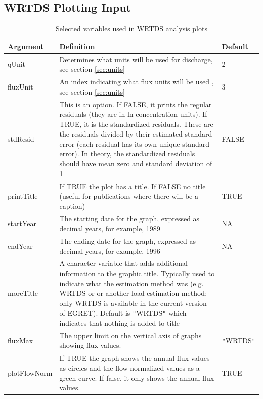 \documentclass[a4paper,11pt]{article}\usepackage[]{graphicx}\usepackage[]{color}
\begin{document}
\FloatBarrier
\clearpage

\subsection{WRTDS Plotting Input}
\label{sec:wrtdsOutputVariables}

\begin{table}[ht]
\caption{Selected variables used in WRTDS analysis plots  \label{tab:wrtdsVariables}}
\begin{tabularx}{\textwidth}{lXl}
\hline
  \textbf{Argument} & \textbf{Definition} & \textbf{Default} \\
\hline
qUnit & Determines what units will be used for discharge, see section \ref{sec:units} & 2\\
fluxUnit & An index indicating what flux units will be used , see section \ref{sec:units} & 3\\
stdResid & This is an option.  If FALSE, it prints the regular residuals (they are in ln concentration units).  If TRUE, it is the standardized residuals.  These are the residuals divided by their estimated standard error (each residual has its own unique standard error).  In theory, the standardized residuals should have mean zero and standard deviation of 1 & FALSE\\
printTitle & If TRUE the plot has a title.  If FALSE no title (useful for publications where there will be a caption) & TRUE\\
startYear & The starting date for the graph, expressed as decimal years, for example, 1989 & NA\\
endYear & The ending date for the graph, expressed as decimal years, for example, 1996 & NA\\
moreTitle & A character variable that adds additional information to the graphic title.  Typically used to indicate what the estimation method was (e.g. WRTDS or or another load estimation method; only WRTDS is available in the current version of EGRET).  Default is \texttt{"}WRTDS\texttt{"} which indicates that nothing is added to title \\
fluxMax & The upper limit on the vertical axis of graphs showing flux values. & \texttt{"}WRTDS\texttt{"}\\
plotFlowNorm & If TRUE the graph shows the annual flux values as circles and the flow-normalized values as a green curve.  If false, it only shows the annual flux values. & TRUE\\
\hline
\end{tabularx}

\end{table}
\end{document}
